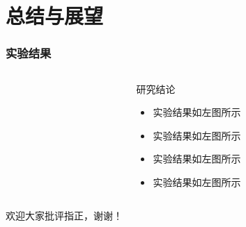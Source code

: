 \documentclass[12pt]{ctexbeamer}	%
\begin{document}

\section{总结与展望}

\begin{frame}
    \frametitle{实验结果}
    \begin{columns}
        \begin{column}{0.50\textwidth}
        \end{column}
        \begin{column}{0.50\textwidth}
            \begin{block}{研究结论}
                \begin{itemize}
                    \item 实验结果如左图所示
                    \item 实验结果如左图所示
                    \item 实验结果如左图所示
                    \item 实验结果如左图所示
                \end{itemize}
            \end{block}
        \end{column}
    \end{columns}
\end{frame}




\begin{frame}
    \centerline{\Large 欢迎大家批评指正，谢谢！}
\end{frame}
\end{document}
